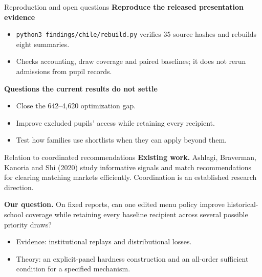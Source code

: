 \begin{frame}{Reproduction and open questions}
\small
\textbf{Reproduce the released presentation evidence}
\begin{itemize}
  \item \texttt{python3 findings/chile/rebuild.py} verifies 35 source hashes
  and rebuilds eight summaries.
  \item Checks accounting, draw coverage and paired baselines;
  it does not rerun admissions from pupil records.
\end{itemize}
\medskip
\textbf{Questions the current results do not settle}
\begin{itemize}
  \item Close the 642--4,620 optimization gap.
  \item Improve excluded pupils' access while retaining every recipient.
  \item Test how families use shortlists when they can apply beyond them.
\end{itemize}
\end{frame}

\begin{frame}{Relation to coordinated recommendations}
\small
\textbf{Existing work.} Ashlagi, Braverman, Kanoria and Shi (2020) study
informative signals and match recommendations for clearing matching markets
efficiently. Coordination is an established research direction.
\par\medskip
\textbf{Our question.} On fixed reports, can one edited menu policy improve
historical-school coverage while retaining every baseline recipient
across several possible priority draws?
\begin{itemize}
  \item Evidence: institutional replays and distributional losses.
  \item Theory: an explicit-panel hardness construction and an all-order
  sufficient condition for a specified mechanism.
\end{itemize}
\end{frame}
